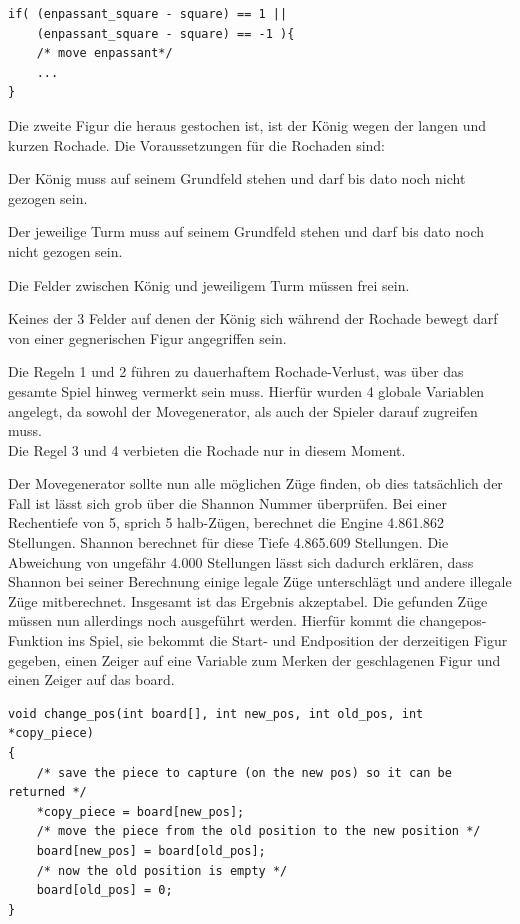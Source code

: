\documentclass[a4paper, 12pt]{article}
\begin{document}
\begin{lstlisting}
if( (enpassant_square - square) == 1 ||
    (enpassant_square - square) == -1 ){
    /* move enpassant*/
    ...
}
\end{lstlisting}


Die zweite Figur die heraus gestochen ist, ist der König wegen der langen und kurzen Rochade.
Die Voraussetzungen für die Rochaden sind:\\


\begin{compactenum}
\item{Der König muss auf seinem Grundfeld stehen und darf bis dato noch nicht gezogen sein.}
\item{Der jeweilige Turm muss auf seinem Grundfeld stehen und darf bis dato noch nicht gezogen sein.}
\item{Die Felder zwischen König und jeweiligem Turm müssen frei sein.}
\item{Keines der 3 Felder auf denen der König sich während der Rochade bewegt darf von einer gegnerischen Figur angegriffen sein.}
\end{compactenum}

Die Regeln 1 und 2 führen zu dauerhaftem Rochade-Verlust, was über das gesamte Spiel hinweg vermerkt sein muss.
Hierfür wurden 4 globale Variablen angelegt, da sowohl der Movegenerator, als auch der Spieler darauf zugreifen muss.\\
Die Regel 3 und 4 verbieten die Rochade nur in diesem Moment. 

Der Movegenerator sollte nun alle möglichen Züge finden, ob dies tatsächlich der Fall ist lässt sich grob über die Shannon Nummer überprüfen\cite[Absatz: Shannon's calculation]{shannon_number}. Bei einer Rechentiefe von 5, sprich 5 halb-Zügen, berechnet die Engine 4.861.862 Stellungen. Shannon berechnet für diese Tiefe 4.865.609 Stellungen. Die Abweichung von ungefähr 4.000 Stellungen lässt sich dadurch erklären, dass Shannon bei seiner Berechnung einige legale Züge unterschlägt und andere illegale Züge mitberechnet.
Insgesamt ist das Ergebnis akzeptabel.
Die gefunden Züge müssen nun allerdings noch ausgeführt werden.
Hierfür kommt die changepos-Funktion ins Spiel, sie bekommt die Start- und Endposition der derzeitigen Figur gegeben, einen Zeiger auf eine Variable zum Merken der geschlagenen Figur und einen Zeiger auf das board.
\newpage


\begin{lstlisting}
void change_pos(int board[], int new_pos, int old_pos, int *copy_piece)
{
    /* save the piece to capture (on the new pos) so it can be returned */
    *copy_piece = board[new_pos];
    /* move the piece from the old position to the new position */
    board[new_pos] = board[old_pos];
    /* now the old position is empty */
    board[old_pos] = 0;
}
\end{lstlisting}
\end{document}
